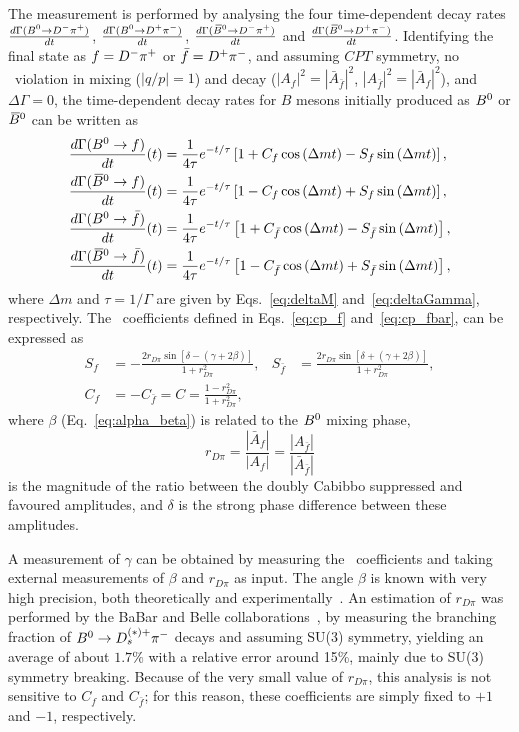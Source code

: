 The measurement is performed by analysing the four time-dependent decay
rates \\
$\frac{d\Gamma(B^0\rightarrow D^-\pi^+)}{dt}$, $\frac{d\Gamma(B^0\rightarrow D^+\pi^-)}{dt}$, $\frac{d\Gamma(\kern 0.18em\overline{\kern -0.18em B}{}^0\rightarrow D^-\pi^+)}{dt}$ and $\frac{d\Gamma(\kern 0.18em\overline{\kern -0.18em B}{}^0\rightarrow D^+\pi^-)}{dt}$. 
Identifying the final state as $f=D^-\pi^+$ or $\bar f=D^+\pi^-$, and assuming $CPT$ symmetry, no \CP~violation in mixing ($|q/p|=1$) and decay
($|A_f|^2=|\bar A_{\bar f}|^2$, $|A_{\bar f}|^2=|\bar A_f|^2$), and $\Delta\Gamma=0$, the time-dependent decay rates for $B$ mesons initially
produced as $B^0$ or $\kern 0.18em\overline{\kern -0.18em B}{}^0$ can be written as
\begin{align}
	\frac{d\Gamma(B^0\rightarrow f)}{dt}(t) &= \frac{1}{4\tau} e^{-t/\tau} \left[ 1 + C_{f} \cos\left(\Delta m t\right) - S_{f} \sin\left(\Delta m t\right) \right], \label{eq:decay-rate-Bf}\\
	\frac{d\Gamma(\kern 0.18em\overline{\kern -0.18em B}{}^0\rightarrow f)}{dt}(t) &= \frac{1}{4\tau} e^{-t/\tau} \left[ 1 - C_{f} \cos\left(\Delta m t\right) + S_{f} \sin\left(\Delta m t\right) \right],\\
	\frac{d\Gamma(B^0\rightarrow \bar f)}{dt}(t) &= \frac{1}{4\tau} e^{-t/\tau} \left[ 1 + C_{\bar f} \cos\left(\Delta m t\right) - S_{\bar f} \sin\left(\Delta m t\right) \right],\\
	\frac{d\Gamma(\kern 0.18em\overline{\kern -0.18em B}{}^0\rightarrow \bar f)}{dt}(t) &= \frac{1}{4\tau} e^{-t/\tau} \left[ 1 - C_{\bar f} \cos\left(\Delta m t\right) + S_{\bar f} \sin\left(\Delta m t\right) \right], \label{eq:decay-rate-Bbfb}
\end{align}
where $\Delta m$ and $\tau=1/\Gamma$ are given by Eqs.~\ref{eq:deltaM} and~\ref{eq:deltaGamma}, respectively.
The \CP~coefficients defined in Eqs.~\ref{eq:cp_f} and~\ref{eq:cp_fbar}, can be expressed as
\begin{align}
	S_{f}&=-\frac{2r_{D\pi}\sin[\delta-(\gamma+2\beta)]}{1+r_{D\pi}^{2}}, & S_{\bar f}&=\frac{2r_{D\pi}\sin[\delta+(\gamma+2\beta)]}{1+r_{D\pi}^{2}}, \\
	C_{f}&=-C_{\bar f}=C=\frac{1-r_{D\pi}^{2}}{1+r_{D\pi}^{2}},
\end{align}
where $\beta$ (Eq.~\ref{eq:alpha_beta}) is related to the $B^0$ mixing
phase, 
\begin{equation}
  r_{D\pi} = \frac{|\bar A_f|}{|A_f|} = \frac{|A_{\bar f}|}{|\bar A_{\bar f}|}
\end{equation}
is the magnitude of
the ratio between the doubly Cabibbo suppressed and favoured amplitudes, and
$\delta$ is the strong phase difference between these amplitudes.

A measurement of $\gamma$ can be obtained by measuring the \CP~coefficients and
taking external measurements of $\beta$ and $r_{D\pi}$ as input. The angle $\beta$ is
known with very high precision, both theoretically and
experimentally~\cite{LHCb-PAPER-2015-005}. An estimation of $r_{D\pi}$ was performed by the
BaBar and Belle collaborations~\cite{Aubert:2008zi,Das:2010be}, by measuring the
branching fraction of $B^0\rightarrow D_{s}^{(*)+} \pi^-$ decays and assuming SU(3)
symmetry, yielding an average of about $1.7\%$ with a relative error around
15\%, mainly due to SU(3) symmetry breaking. Because of the very small value of $r_{D\pi}$, 
this analysis is not sensitive to $C_{f}$ and $C_{\bar f}$; for this reason, 
these coefficients are simply fixed to $+1$ and $-1$, respectively.

